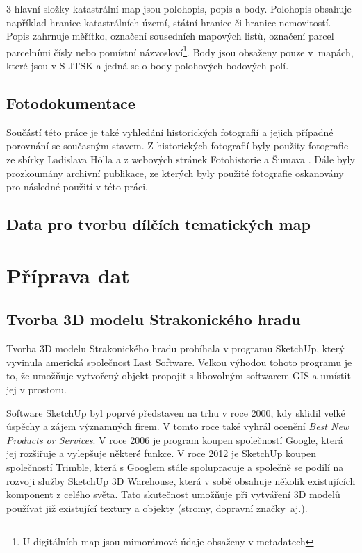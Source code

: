 \documentclass[thesis=M,czech]{FITthesis}[2012/06/26]
\begin{document}
3 hlavní složky katastrální map jsou polohopis, popis a body. Polohopis obsahuje například hranice katastrálních území, státní hranice či hranice nemovitostí. Popis zahrnuje měřítko, označení sousedních mapových listů, označení parcel parcelními čísly nebo pomístní názvosloví\footnote{U digitálních map jsou mimorámové údaje obsaženy v metadatech}. Body jsou obsaženy pouze v~mapách, které jsou v S-JTSK a jedná se o body polohových bodových polí. \cite{cuzk}




\section{Fotodokumentace}
Součástí této práce je také vyhledání historických fotografií a jejich případné porovnání se současným stavem. Z historických fotografií byly použity fotografie ze sbírky Ladislava Hölla a z webových stránek Fotohistorie \cite{fotohistorie} a Šumava \cite{sumava}. Dále byly prozkoumány archivní publikace, ze kterých byly použité fotografie oskanovány pro následné použití v této práci.

\section{Data pro tvorbu dílčích tematických map}


\chapter{Příprava dat}

\section{Tvorba 3D modelu Strakonického hradu}
Tvorba 3D modelu Strakonického hradu probíhala v programu SketchUp, který vyvinula americká společnost Last Software. Velkou výhodou tohoto programu je to, že umožňuje vytvořený objekt propojit s libovolným softwarem GIS a umístit jej v prostoru. 

Software SketchUp byl poprvé představen na trhu v roce 2000, kdy sklidil velké úspěchy a zájem významných firem. V tomto roce také vyhrál ocenění \textit{Best New Products or Services}. V roce 2006 je program koupen společností Google, která jej rozšiřuje a vylepšuje některé funkce. V roce 2012 je SketchUp koupen společností Trimble, která s Googlem stále spolupracuje a společně se podílí na rozvoji služby SketchUp 3D Warehouse, která v sobě obsahuje několik existujících komponent z celého světa. Tato skutečnost umožňuje při vytváření 3D modelů používat již existující textury a objekty (stromy, dopravní značky~aj.).
\end{document}
